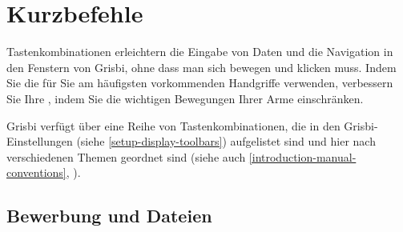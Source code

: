 \section{Kurzbefehle\label{home-shortcuts}}

Tastenkombinationen erleichtern die Eingabe von Daten und die Navigation in den Fenstern von Grisbi, ohne dass man sich bewegen und klicken muss. Indem Sie die für Sie am häufigsten vorkommenden Handgriffe verwenden, verbessern Sie Ihre , indem Sie die wichtigen Bewegungen Ihrer Arme einschränken.
 
Grisbi verfügt über eine Reihe von Tastenkombinationen, die in den Grisbi-Einstellungen (siehe \vref{setup-display-toolbars}) aufgelistet sind und hier nach verschiedenen Themen geordnet sind (siehe auch \vref{introduction-manual-conventions}, ).

\subsection{Bewerbung und Dateien}

